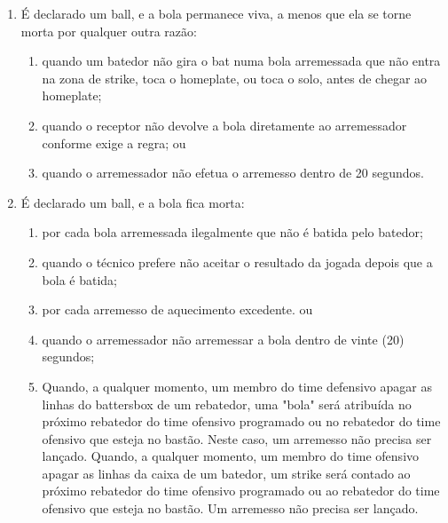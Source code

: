 \begin{enumerate}[label=(\alph*)]\item   É declarado um \gls{ball}, e a bola permanece viva, a menos que ela se torne
	morta por qualquer outra razão:

	\begin{enumerate}[label=\roman*.]
		\item  quando um batedor não gira o \gls{bat} numa bola arremessada que não entra na zona de \gls{strike}, toca o \gls{homeplate}, ou toca o solo, antes de chegar ao \gls{homeplate};
		\item quando o receptor não devolve a bola diretamente ao arremessador conforme exige a regra; ou
		\item quando o arremessador não efetua o arremesso dentro de 20 segundos.
	\end{enumerate}

	\item  É declarado um \gls{ball}, e a bola fica morta:

	\begin{enumerate}[label=\roman*.]
		\item por cada bola arremessada ilegalmente que não é batida pelo batedor;
		\item quando o técnico prefere não aceitar o resultado da jogada depois que a  bola é batida;
		\item por cada arremesso de aquecimento excedente. ou
		\item \begin{mdframed}[hidealllines=true,backgroundcolor=blue!20]quando o arremessador não arremessar a bola dentro de vinte (20) segundos;\end{mdframed}
		\item
		\begin{mdframed}[hidealllines=true,backgroundcolor=blue!20]
			Quando, a qualquer momento, um membro do time defensivo apagar as linhas do \gls{battersbox} de um rebatedor, uma "bola" será atribuída no próximo rebatedor do time ofensivo programado ou no rebatedor do time ofensivo que esteja no bastão. Neste caso, um arremesso não precisa ser lançado. Quando, a qualquer momento, um membro do time ofensivo apagar as linhas da caixa de um batedor, um \gls{strike} será contado ao próximo rebatedor do time ofensivo programado ou ao rebatedor do time ofensivo que esteja no bastão. Um arremesso não precisa ser lançado.
		\end{mdframed}
	\end{enumerate}


\end{enumerate}
